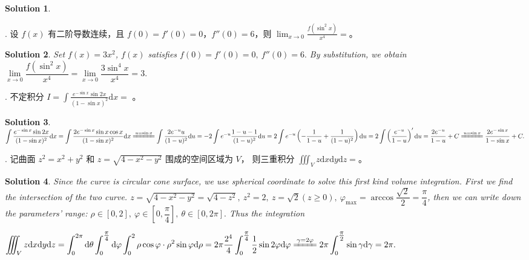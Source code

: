 \documentclass[UTF8]{ctexart}
\makeatletter
\numberwithin{equation}{section}
\numberwithin{figure}{section}
\numberwithin{table}{section}
\newcommand\dif{\mathrm{d}}
\newcommand\no{\noindent}
\newcommand\dis{\displaystyle}
\newcommand\gs{\geqslant}
\newcommand\limxz{\dis\lim\limits_{x\to0}}
\newcommand\dlmu[2][3cm]{\hskip1pt\underline{\hb@xt@ #1{\hss#2\hss}}\hskip3pt}
\theoremstyle{solve}
\newtheorem*{solve}{Solution}
\makeatother
\begin{document}
\begin{spacing}{2.5}
\begin{solve}
\end{solve}

\no 4. 设 $f(x)$ 有二阶导数连续，且 $f(0)=f'(0)=0$，$ f''(0)=6$，则
$\displaystyle\lim_{x \to 0}\frac{f(\sin^2x)}{x^4}=$\dlmu{3}。

\begin{solve}

Set $f(x)=3x^2$, $f(x)$ satisfies $f(0)=f'(0)=0,\ f''(0)=6.$ By substitution, we obtain $
\limxz \dfrac{f(\sin^2x)}{x^4}=\limxz \dfrac{3\sin^4x}{x^4}=3.$

\end{solve}

\no 5. 不定积分 $\dis I=\int\frac{e^{-\sin x}\sin 2x}{(1-\sin x)^2} \dif x=$
\dlmu{$\dfrac{2e^{-\sin x}}{1-\sin x}+C$}。

\begin{solve}

$\dis \int\frac{e^{-\sin x}\sin 2x}{(1-\sin x)^2} \dif x
=\int\frac{2e^{-\sin x}\sin x\cos x}{(1-\sin x)^2} \dif x
\xlongequal{u=\sin x}\int\frac{2e^{-u}u}{(1-u)^2}\dif u
=-2\int e^{-u}\frac{1-u-1}{(1-u)^2}\dif u
=2\int e^{-u}\left(-\dfrac{1}{1-u}+\dfrac{1}{(1-u)^2}\right)\dif u
=2\int \left(\dfrac{e^{-u}}{1-u}\right)'\dif u
=\dfrac{2e^{-u}}{1-u}+C
\xlongequal{u=\sin x}\dfrac{2e^{-\sin x}}{1-\sin x}+C.$

\end{solve}

\no 6. 记曲面 $z^2=x^2+y^2$ 和 $\dis z=\sqrt{4-x^2-y^2}$ 围成的空间区域为 $V$，
则三重积分 
 $\dis\iiint_V z \dif x \dif y \dif z=$\dlmu[1cm]{$2\pi$}。

\begin{solve}

Since the curve is circular cone surface, we use spherical coordinate to solve this first kind volume integration. First we find the intersection of the two curve. 
$\dis z=\sqrt{4-x^2-y^2}=\sqrt{4-z^2},\ z^2=2,\ z=\sqrt{2}(z\gs0),\ \varphi_{\max}
=\arccos\dfrac{\sqrt{2}}{2}=\dfrac{\pi}{4}$, then we can write down the parameters' range: $\rho\in[0,2],\ \varphi\in\left[0,\dfrac{\pi}{4}\right],\ \theta\in[0,2\pi].$ Thus the integration 

\no $\dis\iiint_V z \dif x \dif y \dif z
=\int_0^{2\pi}\dif \theta\int_0^{\tfrac{\pi}{4}}\dif \varphi\int_0^2 \rho\cos\varphi\cdot
\rho^2\sin\varphi\dif \rho
=2\pi\dfrac{2^4}{4}\int_0^{\tfrac{\pi}{4}}\dfrac{1}{2}\sin 2\varphi\dif \varphi
\xlongequal{\gamma=2\varphi}2\pi\int_0^{\tfrac{\pi}{2}}\sin\gamma\dif\gamma
=2\pi.$

\end{solve}

\end{spacing}
\end{document}
